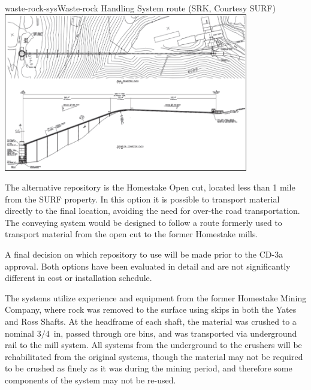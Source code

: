 \begin{cdrfigure}{waste-rock-sys}{Waste-rock Handling System route (SRK, Courtesy SURF)}
\includegraphics[width=0.8\textwidth]{waste-rock-sys}
\end{cdrfigure}

The alternative repository is the Homestake Open cut, located less than 1 mile from the SURF property.  In this option it is possible %
to transport material directly to the final location, avoiding the need for over-the road transportation.  The conveying system would be designed to follow a route formerly used to transport material from the open cut to the former Homestake mills. 

A final decision on which repository to use will be made prior to the CD-3a approval.  Both options have been evaluated in detail and are not significantly different in cost or installation schedule.  %

The systems utilize experience and equipment from the former Homestake Mining Company, %
where rock was removed to the surface using skips in both the Yates and Ross Shafts. At the headframe of each shaft, the material was crushed to a nominal $3/4$~in, passed through ore bins, and was transported via underground rail to the mill system. All systems from the underground to the crushers will be rehabilitated from the original systems, though the material may not be required to be crushed as finely as it was during the mining period, and therefore some components of the system may not be re-used.





